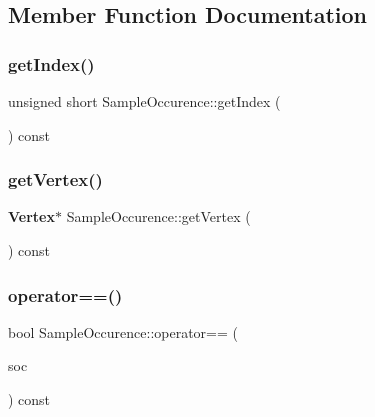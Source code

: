 \subsection{Member Function Documentation}
\mbox{\label{classSampleOccurence_a9df4e9d260db5b23eeed8fe519ab7eb2}} 
\subsubsection{get\+Index()}
{\footnotesize\ttfamily unsigned short Sample\+Occurence\+::get\+Index (\begin{DoxyParamCaption}\item[{void}]{ }\end{DoxyParamCaption}) const\hspace{0.3cm}{\ttfamily [inline]}}

\mbox{\label{classSampleOccurence_a9d1ff94dd20f74f2c513a860104c196c}} 
\subsubsection{get\+Vertex()}
{\footnotesize\ttfamily \textbf{ Vertex}$\ast$ Sample\+Occurence\+::get\+Vertex (\begin{DoxyParamCaption}\item[{void}]{ }\end{DoxyParamCaption}) const\hspace{0.3cm}{\ttfamily [inline]}}

\mbox{\label{classSampleOccurence_a52b8fb5e09fa913cb10ccc0064a29255}} 
\subsubsection{operator==()}
{\footnotesize\ttfamily bool Sample\+Occurence\+::operator== (\begin{DoxyParamCaption}\item[{const \textbf{ Sample\+Occurence} \&}]{soc }\end{DoxyParamCaption}) const\hspace{0.3cm}{\ttfamily [inline]}}

\mbox{\label{classSampleOccurence_a7f55a2999fa450af611ec9cbb94ebf29}} 
